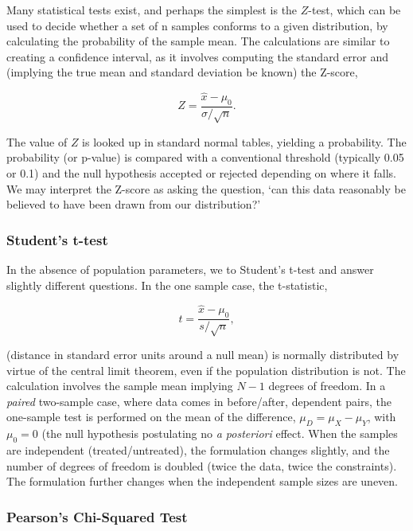 \documentclass[11pt]{amsart}
\begin{document}
Many statistical tests exist, and perhaps the simplest is the $Z$-test, which can be used to decide whether a set of n samples conforms to a given distribution, by calculating the probability of the sample mean. The calculations are similar to creating a confidence interval, as it involves computing the standard error and (implying the true mean and standard deviation be known) the Z-score,

$$Z = \frac{\hat{x} - \mu_0}{\sigma/\sqrt{n}}.$$

The value of $Z$ is looked up in standard normal tables, yielding a probability. The probability (or p-value) is compared with a conventional threshold (typically 0.05 or 0.1) and the null hypothesis accepted or rejected depending on where it falls. We may interpret the Z-score as asking the question, `can this data reasonably be believed to have been drawn from our distribution?'

\subsubsection{Student's t-test}

In the absence of population parameters, we to Student's t-test and answer slightly different questions. In the one sample case, the t-statistic,

$$t = \frac{\hat{x} - \mu_0}{s/\sqrt{n}},$$

(distance in standard error units around a null mean) is normally distributed by virtue of the central limit theorem, even if the population distribution is not. The calculation involves the sample mean implying $N-1$ degrees of freedom. In a \emph{paired} two-sample case, where data comes in before/after, dependent pairs, the one-sample test is performed on the mean of the difference, $\mu_D = \mu_X - \mu_Y$, with $\mu_0 = 0$ (the null hypothesis postulating no \emph{a posteriori} effect. When the samples are independent (treated/untreated), the formulation changes slightly, and the number of degrees of freedom is doubled (twice the data, twice the constraints). The formulation further changes when the independent sample sizes are uneven.

\subsubsection{Pearson's Chi-Squared Test}
\end{document}
